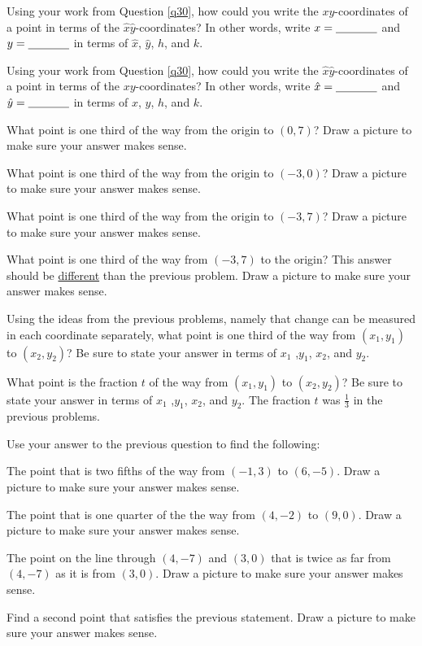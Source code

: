 \bq \label{q31}  \be
\item Using your work from Question \ref{q30}, how could you write the $xy$-coordinates of a point in terms of the $\hat{x} \hat{y}$-coordinates? In other words, write $x=\underline{\hspace{.5in}}$ and $y=\underline{\hspace{.5in}}$ in terms of $\hat{x}$, $\hat{y}$, $h$, and $k$.
\item Using your work from Question \ref{q30}, how could you write the $\hat{x} \hat{y}$-\break coordinates of a point in terms of the $xy$-coordinates? In other words, write $\hat{x}=\underline{\hspace{.5in}}$ and $\hat{y}=\underline{\hspace{.5in}}$ in terms of $x$, $y$, $h$, and $k$.
\ee
\eq


\bq\label{q13} What point is one third of the way from the origin to $(0,7)$? Draw a picture to make sure your answer makes sense.
\eq

\bq What point is one third of the way from the origin to $(-3,0)$? Draw a picture to make sure your answer makes sense.
\eq

\bq What point is one third of the way from the origin to $(-3,7)$? Draw a picture to make sure your answer makes sense.
\eq

\bq What point is one third of the way from $(-3,7)$ to the origin? This answer should be \underline{different} than the previous problem. Draw a picture to make sure your answer makes sense.
\eq

\bq Using the ideas from the previous problems, namely that change can be measured in each coordinate separately, what point is one third of the way from $(x_1,y_1)$ to $(x_2,y_2)$? Be sure to state your answer in terms of $x_1$ ,$y_1$, $x_2$, and $y_2$.
\eq

\bq What point is the fraction $t$ of the way from $(x_1,y_1)$ to $(x_2,y_2)$? Be sure to state your answer in terms of $x_1$ ,$y_1$, $x_2$, and $y_2$. The fraction $t$ was $\frac{1}{3}$ in the previous problems.
\eq

\bq\label{q14} Use your answer to the previous question to find the following:
\be
\item The point that is two fifths of the way from $(-1,3)$ to $(6,-5)$. Draw a picture to make sure your answer makes sense.
\item The point that is one quarter of the the way from $(4,-2)$ to $(9,0)$. Draw a picture to make sure your answer makes sense.
\item The point on the line through $(4,-7)$ and $(3,0)$ that is twice as far from $(4,-7)$ as it is from $(3,0)$. Draw a picture to make sure your answer makes sense.
\item Find a second point that satisfies the previous statement. Draw a picture to make sure your answer makes sense.
\ee
\eq

